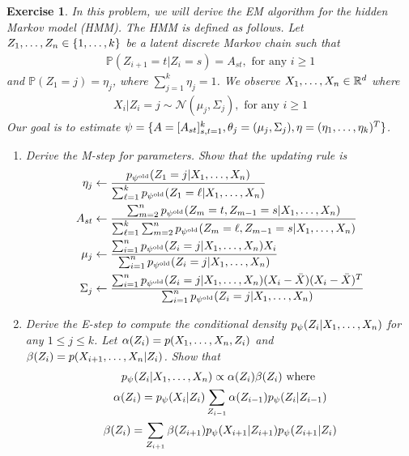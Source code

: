 \documentclass[12pt]{article}
\theoremstyle{colon}
\newtheorem{exercise}{Exercise}
\begin{document}
\begin{exercise}
  In this problem, we will derive the EM algorithm for the hidden Markov model (HMM). The HMM is defined as follows. Let $Z_1, \mathellipsis, Z_n \in \{1, \mathellipsis, k\}$ be a latent discrete Markov chain such that
  \begin{gather*}
    \mathbb{P}(Z_{i+1} = t | Z_i = s) = A_{st}, \text{ for any } i \geq 1
  \end{gather*}
  and $\mathbb{P}(Z_1 = j) = \eta_j$, where $\sum_{j=1}^{k} \eta_j = 1$. We observe $X_1, \mathellipsis, X_n \in \mathbb{R}^d$ where
  \begin{gather*}
    X_i | Z_i = j \sim \mathcal{N}(\mu_j, \Sigma_j), \text{ for any } i \geq 1
  \end{gather*}
  Our goal is to estimate $\psi = \{ A = [A_{st}]_{s,t=1}^k, \theta_j = (\mu_j, \Sigma_j), \eta = (\eta_1, \mathellipsis, \eta_k)^T \}$.
  \begin{enumerate}[label=\arabic*)]
    \item Derive the M-step for parameters. Show that the updating rule is
      \begin{align*}
        \eta_j &\leftarrow \frac{p_{\psi^{\text{old}}}(Z_1 = j | X_1, \mathellipsis, X_n)}{\sum_{\ell = 1}^k p_{\psi^{\text{old}}}(Z_1 = \ell | X_1, \mathellipsis, X_n)} \\
        A_{st} &\leftarrow \frac{\sum_{m=2}^n p_{\psi^{\text{old}}}(Z_m = t, Z_{m-1} = s | X_1, \mathellipsis, X_n)}{\sum_{\ell=1}^k \sum_{m=2}^n p_{\psi^{\text{old}}}(Z_m = \ell, Z_{m-1} = s | X_1, \mathellipsis, X_n)} \\
        \mu_j &\leftarrow \frac{\sum_{i=1}^n p_{\psi^{\text{old}}}(Z_i = j | X_1, \mathellipsis, X_n)X_i}{\sum_{i=1}^n p_{\psi^{\text{old}}}(Z_i = j | X_1, \mathellipsis, X_n)} \\
        \Sigma_j &\leftarrow \frac{\sum_{i=1}^n p_{\psi^{\text{old}}}(Z_i = j | X_1, \mathellipsis, X_n)(X_i - \bar{X})(X_i - \bar{X})^T}{\sum_{i=1}^n p_{\psi^{\text{old}}}(Z_i = j | X_1, \mathellipsis, X_n)}
      \end{align*}

    \item Derive the E-step to compute the conditional density $p_{\psi}(Z_i | X_1, \mathellipsis, X_n)$ for any $1 \leq j \leq k$. Let $\alpha(Z_i) = p(X_1, \mathellipsis, X_n, Z_i)$ and $\beta(Z_i) = p(X_{i+1}, \mathellipsis, X_n | Z_i)$. Show that
      \begin{gather*}
        p_{\psi}( Z_i | X_1, \mathellipsis, X_n) \propto \alpha(Z_i) \beta(Z_i) \text{ where } \\
        \alpha(Z_i) = p_{\psi}( X_i | Z_i) \sum_{Z_{i-1}} \alpha(Z_{i-1}) p_{\psi}( Z_i | Z_{i-1}) \\
        \beta(Z_i) = \sum_{Z_{i+1}} \beta(Z_{i+1}) p_{\psi}( X_{i+1} | Z_{i+1}) p_{\psi}( Z_{i+1} | Z_i)
      \end{gather*}
  \end{enumerate}
\end{exercise}
\end{document}
